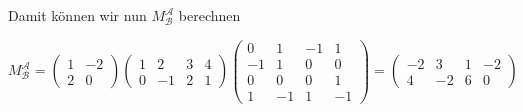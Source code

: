 \documentclass[a4paper,german,12pt,smallheadings]{scrartcl}
\begin{document}
Damit können wir nun $M^{\mathcal{A}}_{\mathcal{B}}$ berechnen

\begin{equation}
  M^{\mathcal{A}}_{\mathcal{B}} =
\begin{pmatrix}
  1 & -2 \\
  2 & 0
\end{pmatrix}
\begin{pmatrix}
  1 &  2 & 3 & 4 \\
  0 & -1 & 2 & 1
\end{pmatrix}
\begin{pmatrix}
   0 &  1 & -1 &  1 \\
  -1 &  1 &  0 &  0 \\
   0 &  0 &  0 &  1 \\
   1 & -1 &  1 & -1
\end{pmatrix}
=
\begin{pmatrix}
-2 &  3 & 1 & -2 \\
 4 & -2 & 6 &  0
\end{pmatrix}
\end{equation}
\end{document}
